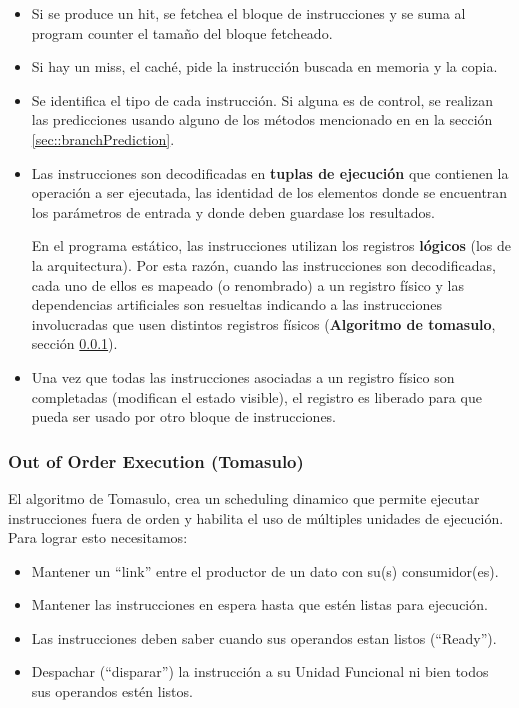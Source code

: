 \begin{itemize}
	\item Si se produce un hit, se fetchea el bloque de instrucciones y se suma al program counter el tamaño del bloque fetcheado.
	\item Si hay un miss, el caché, pide la instrucción buscada en memoria y la copia.
	\item Se identifica el tipo de cada instrucción. Si alguna es de control, se realizan las predicciones usando alguno de los métodos mencionado en en la sección \ref{sec::branchPrediction}.
	\item Las instrucciones son decodificadas en  \textbf{tuplas de ejecución} que contienen la operación a ser ejecutada, las identidad de los elementos donde se encuentran los parámetros de entrada y donde deben guardase los resultados. 
	
	En el programa estático, las instrucciones utilizan los registros \textbf{lógicos} (los de la arquitectura). Por esta razón, cuando las instrucciones son decodificadas, cada uno de ellos es mapeado (o renombrado) a un registro físico y las dependencias artificiales son resueltas indicando a las instrucciones involucradas que usen distintos registros físicos (\textbf{Algoritmo de tomasulo}, sección \ref{ilp::tomasulo}).

	\item Una vez que todas las instrucciones asociadas a un registro físico son completadas (modifican el estado visible), el registro es liberado para que pueda ser usado por otro bloque de instrucciones. 		
\end{itemize}


\subsubsection{Out of Order Execution (Tomasulo)}\label{ilp::tomasulo}
El algoritmo de Tomasulo, crea un scheduling dinamico que permite ejecutar instrucciones fuera de orden y habilita el uso de múltiples unidades de ejecución. Para lograr esto necesitamos:
\begin{itemize}
	\item Mantener un ``link'' entre el productor de un dato con su(s) consumidor(es).
	\item Mantener las instrucciones en espera hasta que estén listas para ejecución.
	\item Las instrucciones deben saber cuando sus operandos estan listos (``Ready'').
	\item Despachar (``disparar'') la instrucción a su Unidad Funcional ni bien todos sus operandos estén listos.
\end{itemize}

